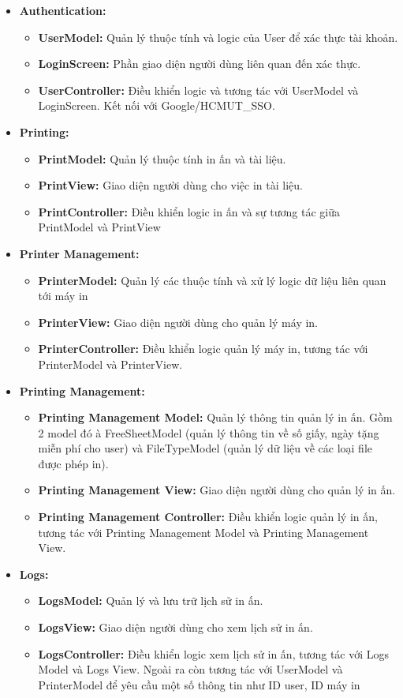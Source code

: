 \begin{itemize}
    \item \textbf{Authentication:}
    \begin{itemize}
        \item \textbf{UserModel:} Quản lý thuộc tính và logic của User để xác thực tài khoản.
        \item \textbf{LoginScreen:} Phần giao diện người dùng liên quan đến xác thực.
        \item \textbf{UserController:} Điều khiển logic và tương tác với UserModel và LoginScreen. Kết nối với Google/HCMUT\_SSO.
    \end{itemize}
    \item \textbf{Printing:}
    \begin{itemize}
        \item \textbf{PrintModel:} Quản lý thuộc tính in ấn và tài liệu.
        \item \textbf{PrintView:} Giao diện người dùng cho việc in tài liệu.
        \item \textbf{PrintController:} Điều khiển logic in ấn và sự tương tác giữa PrintModel và PrintView
    \end{itemize}
    \item \textbf{Printer Management:}
    \begin{itemize}
        \item \textbf{PrinterModel:} Quản lý các thuộc tính và xử lý logic dữ liệu liên quan tới máy in
        \item \textbf{PrinterView:} Giao diện người dùng cho quản lý máy in.
        \item \textbf{PrinterController:} Điều khiển logic quản lý máy in, tương tác với PrinterModel và PrinterView.
    \end{itemize}
    \item \textbf{Printing Management:}
    \begin{itemize}
        \item \textbf{Printing Management Model:} Quản lý thông tin quản lý in ấn. Gồm 2 model đó à FreeSheetModel (quản lý thông tin về số giấy, ngày tặng miễn phí cho user) và FileTypeModel (quản lý dữ liệu về các loại file được phép in).
        \item \textbf{Printing Management View:} Giao diện người dùng cho quản lý in ấn.
        \item \textbf{Printing Management Controller:} Điều khiển logic quản lý in ấn, tương tác với Printing Management Model và Printing Management View.
    \end{itemize}
    \item \textbf{Logs:}
    \begin{itemize}
        \item \textbf{LogsModel:} Quản lý và lưu trữ lịch sử in ấn.
        \item \textbf{LogsView:} Giao diện người dùng cho xem lịch sử in ấn.
        \item \textbf{LogsController:} Điều khiển logic xem lịch sử in ấn, tương tác với Logs Model và Logs View. Ngoài ra còn tương tác với UserModel và PrinterModel để yêu cầu một số thông tin như ID user, ID máy in
    \end{itemize}
\end{itemize}

